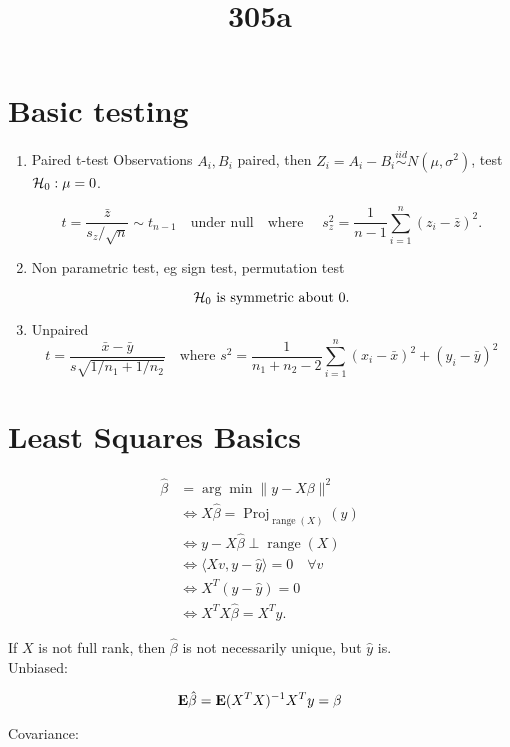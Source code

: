 \documentclass{article}
\title{305a}
\newcommand{\simiid}{\overset{iid}\sim }
\begin{document}
\maketitle
\section{Basic testing}
\begin{enumerate}
    \item Paired t-test
Observations $A_i, B_i$ paired, then $Z_i=A_i - B_i \simiid N(\mu, \sigma^2)$, test $\mathcal H_0 : \mu=0$. 

$$t = \frac{\bar z}{s_z/\sqrt{n}} \sim t_{n-1} \quad \text {under null} \quad \text {where } \quad s_z^2 = \frac{1}{n-1} \sum_{i=1}^n (z_i- \bar z)^2.$$

\item Non parametric test, eg sign test, permutation test


$$\mathcal H_0 \text{ is symmetric about } 0.$$

\item Unpaired 
$$t = \frac{\bar x - \bar y}{s \sqrt{1/n_1 + 1/n_2}} \quad \text {where } s^2 = \frac 1 {n_1 + n_2 -2} \sum_{i=1}^n (x_i - \bar x)^2  + (y_i -\bar y)^2 $$

\end{enumerate}

\section{Least Squares Basics}

\begin{align}
    \hat \beta &= \arg \min \|y - X\beta \|^2  \\
    & \iff X\hat \beta = \operatorname{Proj}_{\operatorname{range}(X)}(y)\\
    & \iff y - X \hat \beta \perp \operatorname{range}(X)\\
    &\iff \langle Xv, y - \hat y\rangle =0 \quad \forall v\\
    & \iff X^T (y-\hat y) = 0\\
    & \iff X^TX \hat \beta = X^T y.
\end{align}

If $X$ is not full rank, then $\hat \beta$ is not necessarily unique, but $\hat y$ is. \\
Unbiased:

$$\mathbf{E} \hat \beta = \mathbf{E} (X^TX)^{-1} X^T y = \beta$$

Covariance:
\end{document}
